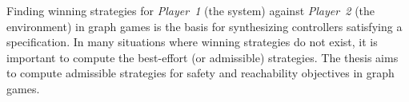 

\begin{abstracts}

Finding winning strategies for \textit{Player~1} (the system) against \textit{Player~2} (the environment) in graph games is the basis for synthesizing controllers satisfying a specification. In many situations where winning strategies do not exist, it is important to compute the best-effort (or admissible) strategies. The thesis aims to compute admissible strategies for safety and reachability objectives in graph games. 

\end{abstracts}
